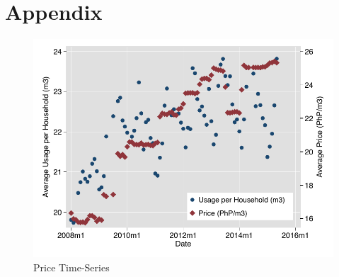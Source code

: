 \documentclass[12pt,table]{article}
\newcommand{\regtext}{
Standard errors are clustered at the small-area level (in parentheses).  The water service area is divided into 2,974 small-areas.
\textsuperscript{c} p$<$0.10,\textsuperscript{b} p$<$0.05,\textsuperscript{a} p$<$0.01 \,\,
}
\begin{document}




\section{Appendix}







% 







\begin{figure}
\begin{center}
\caption{Price Time-Series}\label{figure:pricetimeseries}
\includegraphics[scale=1]{tables/price_time_series.pdf}
\end{center}
\end{figure}
\end{document}
